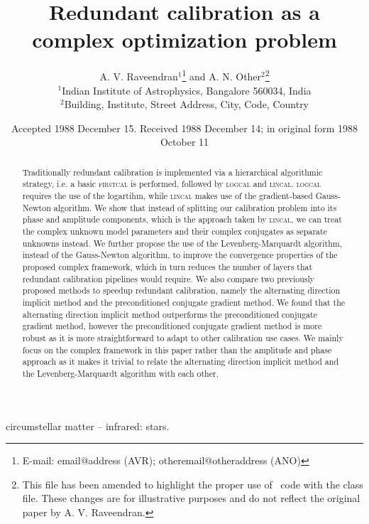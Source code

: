 \documentclass[useAMS,usenatbib]{mn2e}
\title[Unknown]{Redundant calibration as a complex optimization problem}
\author[A. V. Raveendran and A. N. Other]{A. V. Raveendran$^{1}$\thanks{E-mail:
email@address (AVR); otheremail@otheraddress (ANO)} and A. N.
Other$^{2}$\footnotemark[1]\thanks{This file has been amended to
highlight the proper use of \LaTeXe\ code with the class file.
These changes are for illustrative purposes and do not reflect the
original paper by A. V. Raveendran.}\\
$^{1}$Indian Institute of Astrophysics, Bangalore 560034, India\\
$^{2}$Building, Institute, Street Address, City, Code, Country}
\begin{document}
\date{Accepted 1988 December 15. Received 1988 December 14; in original form 1988 October 11}

\pagerange{\pageref{firstpage}--\pageref{lastpage}} 

\maketitle

\label{firstpage}

\begin{abstract}
Traditionally redundant calibration is implemented via a hierarchical algorithmic strategy, i.e. a basic \textsc{firstcal} is performed, followed by \textsc{logcal} and \textsc{lincal}.  
\textsc{logcal} requires the use of the logartihm, while \textsc{lincal} makes use of the gradient-based Gauss-Newton algorithm.
We show that instead of splitting our calibration problem into its phase and amplitude components,
which is the approach taken by \textsc{lincal}, we can treat the complex unknown model parameters and their complex conjugates as separate unknowns instead. 
We further propose the use of the Levenberg-Marquardt algorithm, instead of the Gauss-Newton algorithm, to improve the convergence properties of the proposed complex
framework, which in turn reduces the number of layers that redundant calibration pipelines would require. We also compare two previously proposed methods to speedup redundant calibration, namely the alternating direction implicit method and the preconditioned conjugate gradient method. We found that the alternating 
direction implicit method outperforms the preconditioned conjugate gradient method, however the preconditioned conjugate gradient method is more robust as it is more straightforward to adapt to other calibration use cases. 
We mainly focus on the complex framework in this paper rather than the amplitude and phase approach as it makes it trivial to relate the alternating direction implicit method 
and the Levenberg-Marquardt algorithm with each other.
\end{abstract}


\begin{keywords}
circumstellar matter -- infrared: stars.
\end{keywords}
\end{document}

